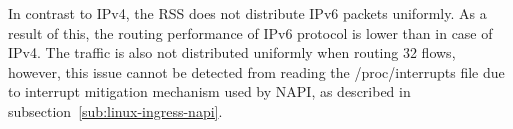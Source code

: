 In contrast to IPv4, the RSS does not distribute IPv6 packets uniformly.
As a result of this, the routing performance of IPv6 protocol is lower than in case of IPv4.
The traffic is also not distributed uniformly when routing 32 flows,
however, this issue cannot be detected from reading the /proc/interrupts file due to
interrupt mitigation mechanism used by NAPI, as described in subsection~\ref{sub:linux-ingress-napi}.
